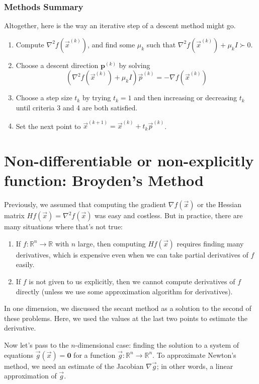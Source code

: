 \documentclass[11pt]{elegantbook}
\begin{document}
\subsection{Methods Summary}
Altogether, here is the way an iterative step of a descent method might go.
\begin{enumerate}
    \item Compute $\nabla^2 f(\vec{x}^{(k)})$, and find some $\mu_k$ such that $\nabla^2 f(\vec{x}^{(k)})+\mu_k I \succ 0$.
    \item Choose a descent direction $\mathbf{p}^{(k)}$ by solving
    $$
    \left(\nabla^2 f(\vec{x}^{(k)})+\mu_k I\right) \vec{p}^{(k)}=-\nabla f(\vec{x}^{(k)})$$
    \item Choose a step size $t_k$ by trying $t_k=1$ and then increasing or decreasing $t_k$ until criteria 3 and 4 are both satisfied.
    \item Set the next point to $\vec{x}^{(k+1)}=\vec{x}^{(k)}+t_k \vec{p}^{(k)}$.
\end{enumerate}

\chapter{Non-differentiable or non-explicitly function: Broyden’s Method}
Previously, we assumed that computing the gradient $\nabla f(\vec{x})$ or the Hessian matrix $Hf(\vec{x})=\nabla^2 f(\vec{x})$ was easy and costless. But in practice, there are many situations where that's not true:
\begin{enumerate}
    \item If $f: \mathbb{R}^n \rightarrow \mathbb{R}$ with $n$ large, then computing $H f(\vec{x})$ requires finding many derivatives, which is expensive even when we can take partial derivatives of $f$ easily.
    \item If $f$ is not given to us explicitly, then we cannot compute derivatives of $f$ directly (unless we use some approximation algorithm for derivatives).
\end{enumerate}
In one dimension, we discussed the secant method as a solution to the second of these problems. Here, we used the values at the last two points to estimate the derivative.

Now let's pass to the $n$-dimensional case: finding the solution to a system of equations $\vec{g}(\vec{x})=\mathbf{0}$ for a function $\vec{g}: \mathbb{R}^n \rightarrow \mathbb{R}^n$. To approximate Newton's method, we need an estimate of the Jacobian $\nabla \vec{g}$; in other words, a linear approximation of $\vec{g}$.
\end{document}
